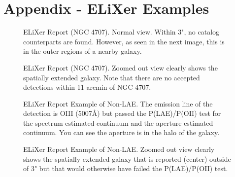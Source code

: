 \documentclass{aastex62}
\begin{document}
\newpage
\section{Appendix - ELiXer Examples}  \label{sec:appendix-elixer}

\begin{figure}[H]
\caption{ELiXer Report (NGC 4707). Normal view. Within 3", no catalog counterparts are found. However, as seen in the next image, this is in the outer regions of a nearby galaxy.  \label{fig:elixer_ngc_4707}}

\caption{ELiXer Report (NGC 4707). Zoomed out view clearly shows the spatially extended galaxy. Note that there are no accepted detections within 11 arcmin of NGC 4707.\label{fig:elixer_ngc_4707_wide}}
\end{figure}


\begin{figure}[H]
\caption{ELiXer Report Example of Non-LAE. The emission line of the detection is OIII (5007$\mbox{\AA}$) but passed the P(LAE)/P(OII) test for the spectrum estimated continuum and the aperture estimated continuum. You can see the aperture is in the halo of the galaxy. \label{fig:elixer_not_lae}}

\caption{ELiXer Report Example of Non-LAE. Zoomed out view clearly shows the spatially extended galaxy that is reported (center) outside of 3" but that would otherwise have failed the P(LAE)/P(OII) test.\label{fig:elixer_not_lae_wide}}
\end{figure}
\end{document}
